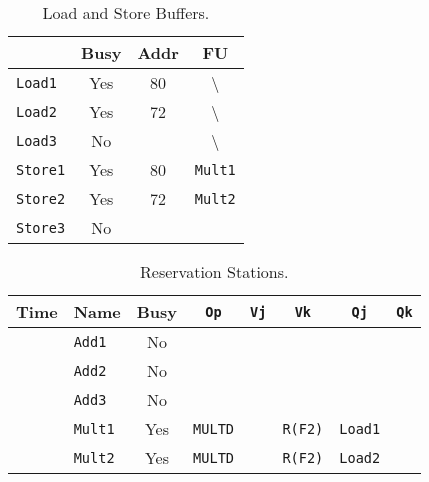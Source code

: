 \begin{enumerate}
    \begin{table}[!htp]
        \centering
        \begin{tabular}{@{} l | c c c @{}}
            \toprule
                                & Busy      & Addr      & FU   \\
            \midrule
            \texttt{Load1}      & Yes       & 80        & \textbackslash        \\ [.3em]
            \texttt{Load2}      & Yes       & 72        & \textbackslash        \\ [.3em]
            \texttt{Load3}      & No        &           & \textbackslash        \\
            \cmidrule{1-4}
            \texttt{Store1}     & Yes       & 80        & \texttt{Mult1}        \\ [.3em]
            \texttt{Store2}     & Yes       & 72        & \texttt{Mult2}        \\ [.3em]
            \texttt{Store3}     & No        &           &                       \\
            \bottomrule
        \end{tabular}
        \caption*{Load and Store Buffers.}
    \end{table}

    \begin{table}[!htp]
        \centering
        \begin{tabular}{@{} l l | c c c c c c @{}}
            \toprule
            Time        & Name              & Busy      & \texttt{Op}           & \texttt{Vj}       & \texttt{Vk}           & \texttt{Qj}           & \texttt{Qk}       \\
            \midrule
                        & \texttt{Add1}     & No        &                       &                   &                       &                       &                   \\ [.3em]
                        & \texttt{Add2}     & No        &                       &                   &                       &                       &                   \\ [.3em]
                        & \texttt{Add3}     & No        &                       &                   &                       &                       &                   \\ [.3em]
                        & \texttt{Mult1}    & Yes       & \texttt{MULTD}        &                   & \texttt{R(F2)}        & \texttt{Load1}        &                   \\ [.3em]
                        & \texttt{Mult2}    & Yes       & \texttt{MULTD}        &                   & \texttt{R(F2)}        & \texttt{Load2}        &                   \\
            \bottomrule
        \end{tabular}
        \caption*{Reservation Stations.}
    \end{table}


\end{enumerate}
